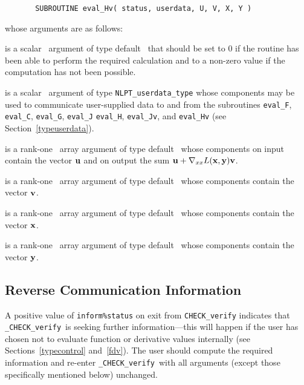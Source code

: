 \documentclass{galahad}
\newcommand{\packagename}{CHECK}
\newcommand{\fullpackagename}{\libraryname\_\packagename}
\newcommand{\solver}{{\tt \fullpackagename\_verify}}
\begin{document}
\def\baselinestretch{0.8}
{\tt \begin{verbatim}
       SUBROUTINE eval_Hv( status, userdata, U, V, X, Y ) \end{verbatim} }
\def\baselinestretch{1.0}
\noindent whose arguments are as follows:

\begin{description}
 is a scalar \intentout\ argument of type default \integer\
that should be set to 0 if the routine has been able to perform the
required calculation and to a non-zero value if the computation has not
been possible. 

 is a scalar \intentinout\ argument of type 
{\tt NLPT\_userdata\_type} whose components may be used
to communicate user-supplied data to and from the
subroutines {\tt eval\_F}, {\tt eval\_C}, {\tt eval\_G}, {\tt eval\_J}
{\tt eval\_H}, {\tt eval\_Jv}, and {\tt eval\_Hv} 
(see Section~\ref{typeuserdata}). 

 is a rank-one \intentinout\ array argument of type default \realdp\
whose components on input contain the vector ${\mathbf{u}}$ and on output the
sum ${\mathbf{u}} + \nabla_{xx} L({\mathbf{x}},{\mathbf{y}}) {\mathbf{v}}$.

 is a rank-one \intentin\ array argument of type default \realdp\
whose components contain the vector ${\mathbf{v}}$.

\ittf{X} is a rank-one \intentin\ array argument of type default \realdp\
whose components contain the vector ${\mathbf{x}}$.

 is a rank-one \intentin\ array argument of type default \realdp\
whose components contain the vector ${\mathbf{y}}$.

\end{description}


\subsection{\label{reverse}Reverse Communication Information}

A positive value of {\tt inform\%status} on exit from 
{\tt \packagename\_verify}
indicates that
\solver\ is seeking further information---this will happen 
if the user has chosen not to evaluate function or 
derivative values internally (see Sections~\ref{typecontrol} and~\ref{fdv}).
The user should compute the required information and re-enter \solver\
with all arguments (except those specifically mentioned below) unchanged.
\end{document}
